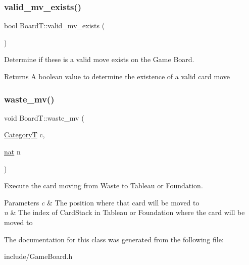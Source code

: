 \subsubsection{\texorpdfstring{valid\+\_\+mv\+\_\+exists()}{valid\_mv\_exists()}}
{\footnotesize\ttfamily bool Board\+T\+::valid\+\_\+mv\+\_\+exists (\begin{DoxyParamCaption}{ }\end{DoxyParamCaption})}



Determine if these is a valid move exists on the Game Board. 

\begin{DoxyReturn}{Returns}
A boolean value to determine the existence of a valid card move 
\end{DoxyReturn}
\mbox{\label{class_board_t_adb96accaa92d62594a5cc83e0574a1ed}} 
\subsubsection{\texorpdfstring{waste\+\_\+mv()}{waste\_mv()}}
{\footnotesize\ttfamily void Board\+T\+::waste\+\_\+mv (\begin{DoxyParamCaption}\item[{\hyperlink{_card_types_8h_aa77f81f8d4c8aa57046a50ca32d6b7b4}{CategoryT}}]{c,  }\item[{\hyperlink{_card_types_8h_a56638ee9d162e8cce3a15f92d2023d6e}{nat}}]{n }\end{DoxyParamCaption})}



Execute the card moving from Waste to Tableau or Foundation. 


\begin{DoxyParams}{Parameters}
{\em c} & The position where that card will be moved to \\
\hline
{\em n} & The index of Card\+Stack in Tableau or Foundation where the card will be moved to \\
\hline
\end{DoxyParams}


The documentation for this class was generated from the following file\+:\begin{DoxyCompactItemize}
\item 
include/Game\+Board.\+h\end{DoxyCompactItemize}
